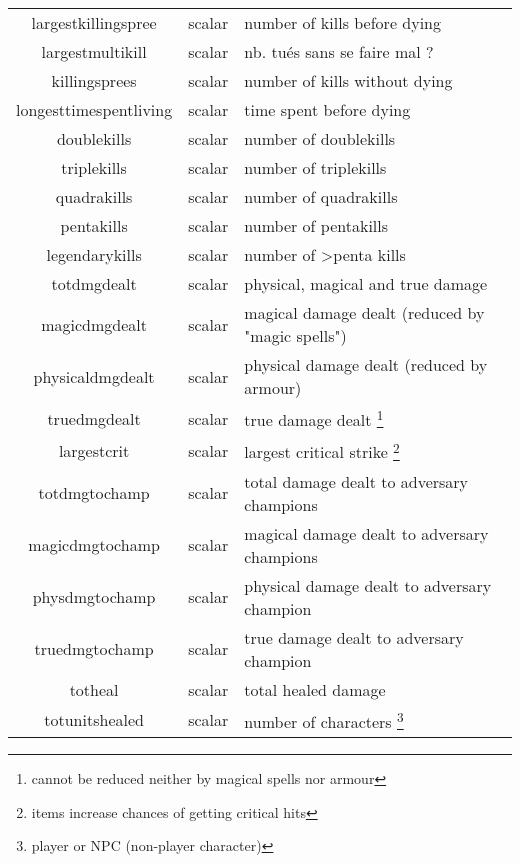 \begin{longtable}{|c|c|l|}
        largestkillingspree         & scalar          & number of kills before dying\\
        largestmultikill            & scalar          & nb. tués sans se faire mal ? \\
        killingsprees               & scalar          & number of kills without dying\\
        longesttimespentliving      & scalar          & time spent before dying\\
        doublekills                 & scalar          & number of doublekills\\
        triplekills                 & scalar          & number of triplekills\\
        quadrakills                 & scalar          & number of quadrakills\\
        pentakills                  & scalar          & number of pentakills\\
        legendarykills              & scalar          & number of >penta kills \\
        totdmgdealt                 & scalar          & physical, magical and true damage\\
        magicdmgdealt               & scalar          & magical damage dealt (reduced by "magic spells")\\
        physicaldmgdealt            & scalar          & physical damage dealt (reduced by armour)\\
        truedmgdealt                & scalar          & true damage dealt \footnote{cannot be reduced neither by magical spells nor armour}\\
        largestcrit                 & scalar		  & largest critical strike \footnote{items increase chances of getting critical hits}\\
        totdmgtochamp               & scalar          & total damage dealt to adversary champions\\
        magicdmgtochamp             & scalar          & magical damage dealt to adversary champions\\
        physdmgtochamp              & scalar          & physical damage dealt to adversary champion\\
        truedmgtochamp              & scalar          & true damage dealt to adversary champion\\
        totheal                     & scalar          & total healed damage\\
        totunitshealed              & scalar          & number of characters \footnote{player or NPC (non-player character)}\\

\end{longtable}
